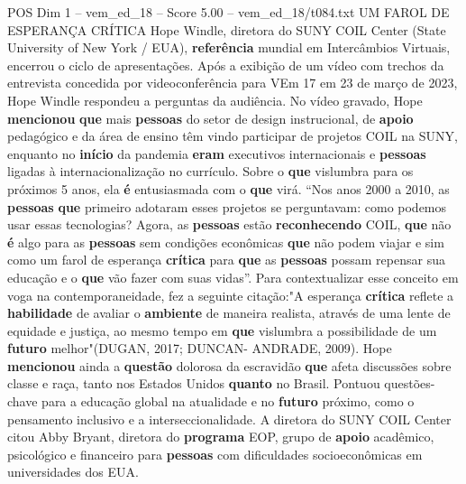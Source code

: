 \begin{textsample}{POS Dim 1 – vem\_ed\_18 – Score 5.00 – vem\_ed\_18/t084.txt}  \label{ex:f1_pos_115}
UM FAROL DE ESPERANÇA CRÍTICA Hope Windle, diretora do SUNY COIL Center (State University of New York / EUA), \textbf{referência} mundial em Intercâmbios Virtuais, encerrou o ciclo de apresentações.
Após a exibição de um vídeo com trechos da entrevista concedida por videoconferência para VEm 17 em 23 de março de 2023, Hope Windle respondeu a perguntas da audiência.
No vídeo gravado, Hope \textbf{mencionou} \textbf{que} mais \textbf{pessoas} do setor de design instrucional, de \textbf{apoio} pedagógico e da área de ensino têm vindo participar de projetos COIL na SUNY, enquanto no \textbf{início} da pandemia \textbf{eram} executivos internacionais e \textbf{pessoas} ligadas à internacionalização no currículo.
Sobre o \textbf{que} vislumbra para os próximos 5 anos, ela \textbf{é} entusiasmada com o \textbf{que} virá. “Nos anos 2000 a 2010, as \textbf{pessoas} \textbf{que} primeiro adotaram esses projetos se perguntavam: como podemos usar essas tecnologias?
Agora, as \textbf{pessoas} estão \textbf{reconhecendo} COIL, \textbf{que} não \textbf{é} algo para as \textbf{pessoas} sem condições econômicas \textbf{que} não podem viajar e sim como um farol de esperança \textbf{crítica} para \textbf{que} as \textbf{pessoas} possam repensar sua educação e o \textbf{que} vão fazer com suas vidas”.
Para contextualizar esse conceito em voga na contemporaneidade, fez a seguinte citação:"A esperança \textbf{crítica} reflete a \textbf{habilidade} de avaliar o \textbf{ambiente} de maneira realista, através de uma lente de equidade e justiça, ao mesmo tempo em \textbf{que} vislumbra a possibilidade de um \textbf{futuro} melhor"(DUGAN, 2017; DUNCAN- ANDRADE, 2009).
Hope \textbf{mencionou} ainda a \textbf{questão} dolorosa da escravidão \textbf{que} afeta discussões sobre classe e raça, tanto nos Estados Unidos \textbf{quanto} no Brasil.
Pontuou questões-chave para a educação global na atualidade e no \textbf{futuro} próximo, como o pensamento inclusivo e a interseccionalidade.
A diretora do SUNY COIL Center citou Abby Bryant, diretora do \textbf{programa} EOP, grupo de \textbf{apoio} acadêmico, psicológico e financeiro para \textbf{pessoas} com dificuldades socioeconômicas em universidades dos EUA.

\end{textsample}
